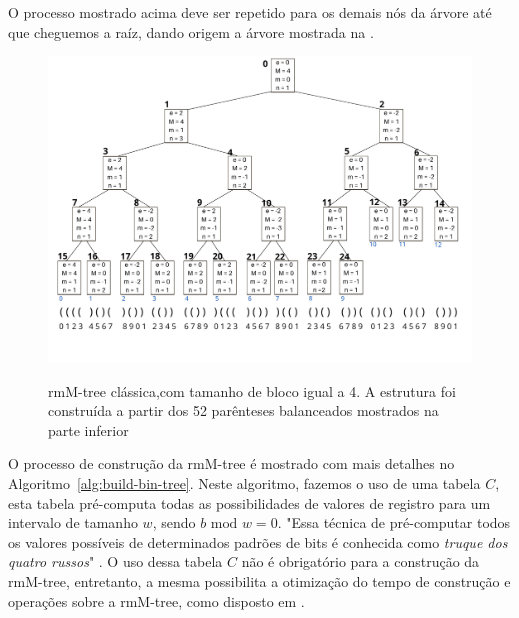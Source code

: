 \begin{example}
    O processo mostrado acima deve ser repetido para os demais nós da árvore até que cheguemos a raíz, dando origem a árvore mostrada na . 
    \begin{figure}[!ht]
     \centering
      \caption[rmM-tree clássica.]{rmM-tree clássica,com tamanho de bloco igual a 4. A estrutura foi construída a partir dos 52 parênteses balanceados mostrados na parte inferior}
      \includegraphics[width=\columnwidth]{images/rmm-tree-bin.png}
      \label{fig:rmm-tree-binaria}
    \end{figure}
\end{example}

O processo de construção da rmM-tree é mostrado com mais detalhes no Algoritmo~\ref{alg:build-bin-tree}. Neste algoritmo, fazemos o uso de uma tabela $C$, esta tabela pré-computa todas as possibilidades de valores de registro para um intervalo de tamanho $w$, sendo $b \mbox{ mod } w = 0$. "Essa técnica de pré-computar todos os valores possíveis de determinados padrões de bits é conhecida como \textit{truque dos quatro russos}" \citep[tradução nossa]{book-gusfield}.
O uso dessa tabela $C$ não é obrigatório para a construção da rmM-tree, entretanto, a mesma possibilita a otimização do tempo de construção e operações sobre a rmM-tree, como disposto em \citet{book-compact-data-structures}.


